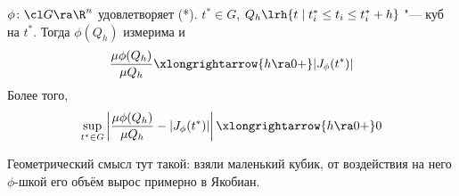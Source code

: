 \begin{theorem}
	$\phi\colon \cl G \ra \R^n$ удовлетворяет (*).
	$t^* \in G$, $Q_h \lrh \{t \mid t^*_i \le t_i \le t^*_i + h\}$ "--- куб на $t^*$.
	Тогда $\phi(Q_h)$ измерима и
	\[
		\frac{\mu \phi(Q_h)}{\mu Q_h} \xlongrightarrow{h \ra 0+} |J_\phi(t^*)|
	\]
	Более того,
	\[
		\sup_{t^* \in G} \left| \frac{\mu \phi(Q_h)}{\mu Q_h} - |J_\phi(t^*)|\right| \xlongrightarrow{h \ra 0+} 0
	\]
\end{theorem}
\begin{Rem}
	Геометрический смысл тут такой: взяли маленький кубик, от воздействия на него $\phi$-шкой его объём вырос примерно в Якобиан.
\end{Rem}
